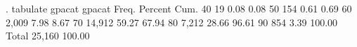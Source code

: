 . tabulate gpacat
{\smallskip}
     gpacat {\VBAR}      Freq.     Percent        Cum.
         40 {\VBAR}         19        0.08        0.08
         50 {\VBAR}        154        0.61        0.69
         60 {\VBAR}      2,009        7.98        8.67
         70 {\VBAR}     14,912       59.27       67.94
         80 {\VBAR}      7,212       28.66       96.61
         90 {\VBAR}        854        3.39      100.00
      Total {\VBAR}     25,160      100.00
{\smallskip}
